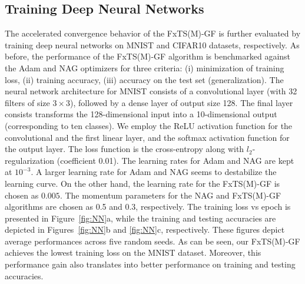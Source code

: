 \documentclass[letterpaper]{article}
\begin{document}

\subsection{Training Deep Neural Networks}\label{subsec:TrainDNN}
The accelerated convergence behavior of the FxTS(M)-GF is further evaluated by training deep neural networks on MNIST and CIFAR10 datasets, respectively. As before, the performance of the FxTS(M)-GF algorithm is benchmarked against the Adam and NAG optimizers for three criteria: (i) minimization of training loss, (ii) training accuracy, (iii) accuracy on the test set (generalization). The neural network architecture for MNIST consists of a convolutional layer (with 32 filters of size $3\times3$), followed by a dense layer of output size 128. The final layer consists transforms the 128-dimensional input into a 10-dimensional output (corresponding to ten classes). We employ the ReLU activation function for the convolutional and the first linear layer, and the softmax activation function for the output layer. The loss function is the cross-entropy along with $l_2$-regularization (coefficient 0.01). The learning rates for Adam and NAG are kept at $10^{-3}$. A larger learning rate for Adam and NAG seems to destabilize the learning curve. On the other hand, the learning rate for the FxTS(M)-GF is chosen as $0.005$. The momentum parameters for the NAG and FxTS(M)-GF algorithms are chosen as 0.5 and 0.3, respectively. The training loss vs epoch is presented in Figure~\ref{fig:NN}a, while the training and testing accuracies are depicted in Figures~\ref{fig:NN}b and \ref{fig:NN}c, respectively. These figures depict average performances across five random seeds. As can be seen, our FxTS(M)-GF achieves the lowest training loss on the MNIST dataset. Moreover, this performance gain also translates into better performance on training and testing accuracies.
\end{document}
